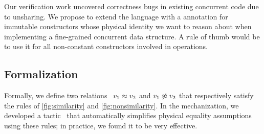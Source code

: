 Our verification work uncovered correctness bugs in existing \OCaml concurrent code due to unsharing. We propose to extend the language with a \ocamlinline{[@generative]} annotation for immutable constructors whose physical identity we want to reason about when implementing a fine-grained concurrent data structure. A rule of thumb would be to use it for all non-constant constructors involved in  operations.

\subsection{Formalization}



Formally, we define two relations~ $v_1 \similar v_2$ and $v_1 \nonsimilar v_2$ that respectively satisfy the rules of \cref{fig:similarity} and \cref{fig:nonsimilarity}.
In the \Rocq mechanization, we developed a tactic~ that automatically simplifies physical equality assumptions using these rules; in practice, we found it to be very effective.

